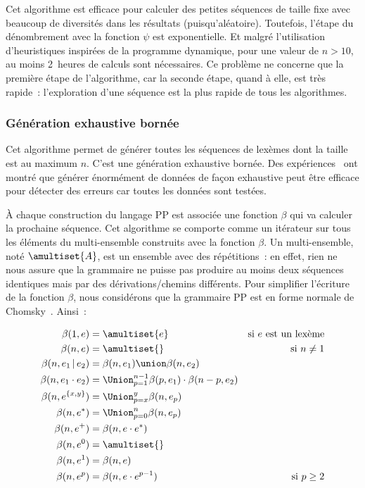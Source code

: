 Cet algorithme est efficace pour calculer des petites séquences de taille fixe
avec beaucoup de diversités dans les résultats (puisqu'aléatoire).  Toutefois,
l'étape du dénombrement avec la fonction $\psi$ est exponentielle. Et malgré
l'utilisation d'heuristiques inspirées de la programme dynamique, pour une
valeur de $n > 10$, au moins 2~heures de calculs sont nécessaires. Ce problème
ne concerne que la première étape de l'algorithme, car la seconde étape, quand à
elle, est très rapide~: l'exploration d'une séquence est la plus rapide de tous
les algorithmes.

\subsubsection{Génération exhaustive bornée}
\label{subsection:data:bounded_exhaustive_generation}

Cet algorithme permet de générer toutes les séquences de lexèmes dont la taille
est au maximum $n$. C'est une génération exhaustive bornée. Des
expériences~ ont montré que générer énormément
de données de façon exhaustive peut être efficace pour détecter des erreurs car
toutes les données sont testées.

À chaque construction du langage PP est associée une fonction $\beta$ qui va
calculer la prochaine séquence. Cet algorithme se comporte comme un itérateur
sur tous les éléments du multi-ensemble construits avec la fonction $\beta$. Un
multi-ensemble, noté $\amultiset{A}$, est un ensemble avec des répétitions~: en
effet, rien ne nous assure que la grammaire ne puisse pas produire au moins deux
séquences identiques mais par des dérivations/chemins différents. Pour
simplifier l'écriture de la fonction $\beta$, nous considérons que la grammaire
PP est en forme normale de Chomsky~. Ainsi~:

\begin{align*}
%
\beta(1, e) & =
    \amultiset{e}
    &
    \text{si $e$ est un lexème}
    \\
%
\beta(n, e) & =
    \amultiset{}
    &
    \text{si $n \neq 1$}
    \\
%
\beta(n, e_1 \,\vert\, e_2) & =
    \beta(n, e_1) \union \beta(n, e_2)
    \\
%
\beta(n, e_1 \cdot e_2) & =
    \Union_{p = 1}^{n - 1}
    \beta(p, e_1) \cdot \beta(n - p, e_2)
    \\
%
\beta(n, e^{\{x, y\}}) & =
    \Union_{p = x}^y \beta(n, e_p)
    \\
%
\beta(n, e^*) & =
    \Union_{p = 0}^n \beta(n, e_p)
    \\
%
\beta(n, e^+) & =
    \beta(n, e \cdot e^*)
    \\
%
\beta(n, e^0) & =
    \amultiset{}
    \\
%
\beta(n, e^1) & =
    \beta(n, e)
    \\
%
\beta(n, e^p) & =
    \beta(n, e \cdot e^{p - 1})
    &
    \text{si $p \geq 2$}
%
\end{align*}

